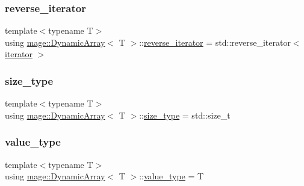 \mbox{\label{classmage_1_1_dynamic_array_a92d505734e8500e429d6b6e690b83dab}} 
\subsubsection{\texorpdfstring{reverse\+\_\+iterator}{reverse\_iterator}}
{\footnotesize\ttfamily template$<$typename T$>$ \\
using \mbox{\hyperlink{classmage_1_1_dynamic_array}{mage\+::\+Dynamic\+Array}}$<$ T $>$\+::\mbox{\hyperlink{classmage_1_1_dynamic_array_a92d505734e8500e429d6b6e690b83dab}{reverse\+\_\+iterator}} =  std\+::reverse\+\_\+iterator$<$ \mbox{\hyperlink{classmage_1_1_dynamic_array_af49b03e8ab90f3f38f6fc735cef81baf}{iterator}} $>$}

\mbox{\label{classmage_1_1_dynamic_array_abae3236bcd8d1de414cbdf05219966b9}} 
\subsubsection{\texorpdfstring{size\+\_\+type}{size\_type}}
{\footnotesize\ttfamily template$<$typename T$>$ \\
using \mbox{\hyperlink{classmage_1_1_dynamic_array}{mage\+::\+Dynamic\+Array}}$<$ T $>$\+::\mbox{\hyperlink{classmage_1_1_dynamic_array_abae3236bcd8d1de414cbdf05219966b9}{size\+\_\+type}} =  std\+::size\+\_\+t}

\mbox{\label{classmage_1_1_dynamic_array_a1f26711f844168c39991df0d5a340178}} 
\subsubsection{\texorpdfstring{value\+\_\+type}{value\_type}}
{\footnotesize\ttfamily template$<$typename T$>$ \\
using \mbox{\hyperlink{classmage_1_1_dynamic_array}{mage\+::\+Dynamic\+Array}}$<$ T $>$\+::\mbox{\hyperlink{classmage_1_1_dynamic_array_a1f26711f844168c39991df0d5a340178}{value\+\_\+type}} =  T}



